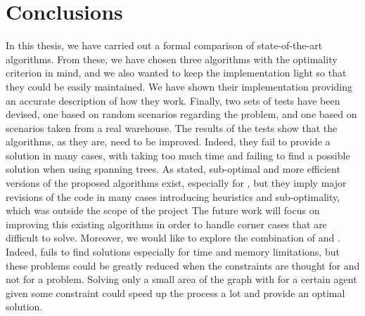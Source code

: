 \chapter{Conclusions}
\label{ch:conclusions}
In this thesis, we have carried out a formal comparison of state-of-the-art
algorithms. From these, we have chosen three algorithms with the optimality
criterion in mind, and we also wanted to keep the implementation light so that
they could be easily maintained. We have shown their implementation providing
an accurate description of how they work. \newline
Finally, two sets of tests have been devised, one based on random scenarios
regarding the  problem, and one based on scenarios taken from a real
warehouse. The results of the tests show that the algorithms, as they are, need
to be improved. Indeed, they fail to provide a solution in many cases, with
 taking too much time and  failing to find a possible
solution when using spanning trees. As stated, sub-optimal and more efficient
versions of the proposed algorithms exist, especially for , but they
imply major revisions of the code in many cases introducing heuristics and
sub-optimality, which was outside the scope of the project \newline
The future work will focus on improving this existing algorithms in order to
handle corner cases that are difficult to solve. Moreover, we would like to
explore the combination of  and . Indeed,  fails to
find solutions especially for time and memory limitations, but these problems
could be greatly reduced when the constraints are thought for  and
not for a  problem. Solving only a small area of the graph with
 for a certain agent given some constraint could speed up the
 process a lot and provide an optimal solution. 
